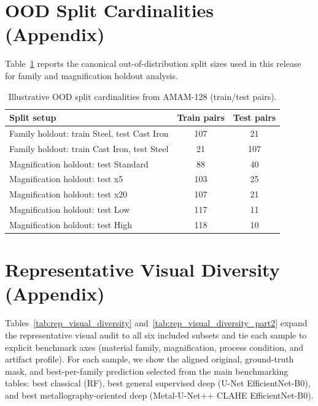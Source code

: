 \documentclass{article}
\newcommand{\datasetname}{AMAM-128}
\newcommand{\tablefontsize}{\small}
\begin{document}
\section{OOD Split Cardinalities (Appendix)}
Table~\ref{tab:oodsplits} reports the canonical out-of-distribution split sizes used in this release for family and magnification holdout analysis.
\begin{table}[ht]
    \centering
    \tablefontsize
    \caption{Illustrative OOD split cardinalities from \datasetname{} (train/test pairs).}
    \label{tab:oodsplits}
    \begin{tabular}{lcc}
        \toprule
        Split setup & Train pairs & Test pairs \\
        \midrule
        Family holdout: train Steel, test Cast Iron & 107 & 21 \\
        Family holdout: train Cast Iron, test Steel & 21 & 107 \\
        Magnification holdout: test Standard & 88 & 40 \\
        Magnification holdout: test x5 & 103 & 25 \\
        Magnification holdout: test x20 & 107 & 21 \\
        Magnification holdout: test Low & 117 & 11 \\
        Magnification holdout: test High & 118 & 10 \\
        \bottomrule
    \end{tabular}
\end{table}

\section{Representative Visual Diversity (Appendix)}
Tables~\ref{tab:rep_visual_diversity} and~\ref{tab:rep_visual_diversity_part2} expand the representative visual audit to all six included subsets and tie each sample to explicit benchmark axes (material family, magnification, process condition, and artifact profile). For each sample, we show the aligned original, ground-truth mask, and best-per-family prediction selected from the main benchmarking tables: best classical (RF), best general supervised deep (U-Net EfficientNet-B0), and best metallography-oriented deep (Metal-U-Net++ CLAHE EfficientNet-B0).
\end{document}
